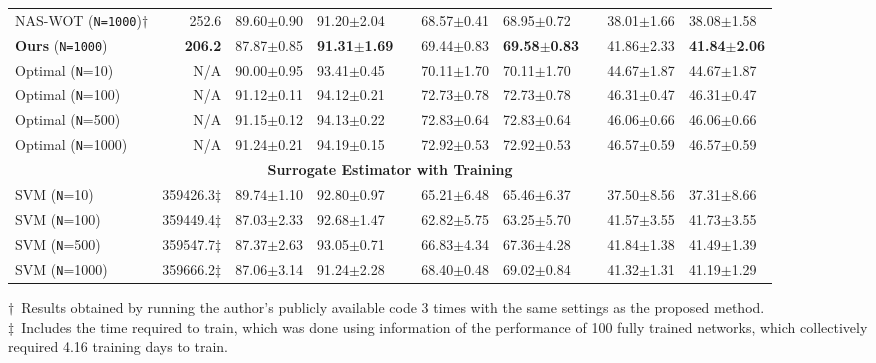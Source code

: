 \documentclass[10pt, conference]{IEEEtran}
\begin{document}
\begin{table*}[htb]
{\begin{tabular}{@{}lr@{\hskip 0.15in}llcllcll@{}}
			NAS-WOT (\texttt{N=1000}){$\dagger$}& 252.6 & 89.60$\pm$0.90 & 91.20$\pm$2.04 && 68.57$\pm$0.41 & 68.95$\pm$0.72 && 38.01$\pm$1.66 & 38.08$\pm$1.58 \\
			\textbf{Ours} (\texttt{N=1000})& \textbf{206.2} & 87.87$\pm$0.85 & \textbf{91.31}$\pm$\textbf{1.69} && 69.44$\pm$0.83 & \textbf{69.58}$\pm$\textbf{0.83} && 41.86$\pm$2.33       & \textbf{41.84}$\pm$\textbf{2.06} \\
			
\midrule
Optimal (\texttt{N}=10)  & N/A & 90.00$\pm$0.95 & 93.41$\pm$0.45  && 70.11$\pm$1.70  & 70.11$\pm$1.70   && 44.67$\pm$1.87       & 44.67$\pm$1.87 \\
			Optimal (\texttt{N}=100) & N/A & 91.12$\pm$0.11 & 94.12$\pm$0.21  && 72.73$\pm$0.78  & 72.73$\pm$0.78   && 46.31$\pm$0.47       & 46.31$\pm$0.47 \\
			Optimal (\texttt{N}=500) & N/A & 91.15$\pm$0.12 & 94.13$\pm$0.22  && 72.83$\pm$0.64  & 72.83$\pm$0.64   && 46.06$\pm$0.66       & 46.06$\pm$0.66 \\
			Optimal (\texttt{N}=1000)& N/A & 91.24$\pm$0.21 & 94.19$\pm$0.15  && 72.92$\pm$0.53  & 72.92$\pm$0.53   && 46.57$\pm$0.59       & 46.57$\pm$0.59 \\ 
			\midrule
			\midrule
			\multicolumn{10}{c}{\textbf{Surrogate Estimator with Training}}\\
			SVM (\texttt{N}=10)   & 359426.3$\ddag$  & 89.74$\pm$1.10 & 92.80$\pm$0.97  && 65.21$\pm$6.48  & 65.46$\pm$6.37   && 37.50$\pm$8.56       & 37.31$\pm$8.66 \\
			SVM (\texttt{N}=100)  & 359449.4$\ddag$ & 87.03$\pm$2.33 & 92.68$\pm$1.47  && 62.82$\pm$5.75  & 63.25$\pm$5.70   && 41.57$\pm$3.55       & 41.73$\pm$3.55 \\
			SVM (\texttt{N}=500)  & 359547.7$\ddag$& 87.37$\pm$2.63 & 93.05$\pm$0.71  && 66.83$\pm$4.34  & 67.36$\pm$4.28   && 41.84$\pm$1.38       & 41.49$\pm$1.39 \\
			SVM (\texttt{N}=1000) & 359666.2$\ddag$& 87.06$\pm$3.14 & 91.24$\pm$2.28  && 68.40$\pm$0.48  & 69.02$\pm$0.84   && 41.32$\pm$1.31       & 41.19$\pm$1.29 \\ 
			\midrule
		\end{tabular}
	}
	$\dagger$~Results obtained by running the author's publicly available code 3 times with the same settings as the proposed method.\\
	$\ddag$~Includes the time required to train, which was done using information of the performance of 100 fully trained networks, which collectively required 4.16 training days to train.
\end{table*}
\end{document}
